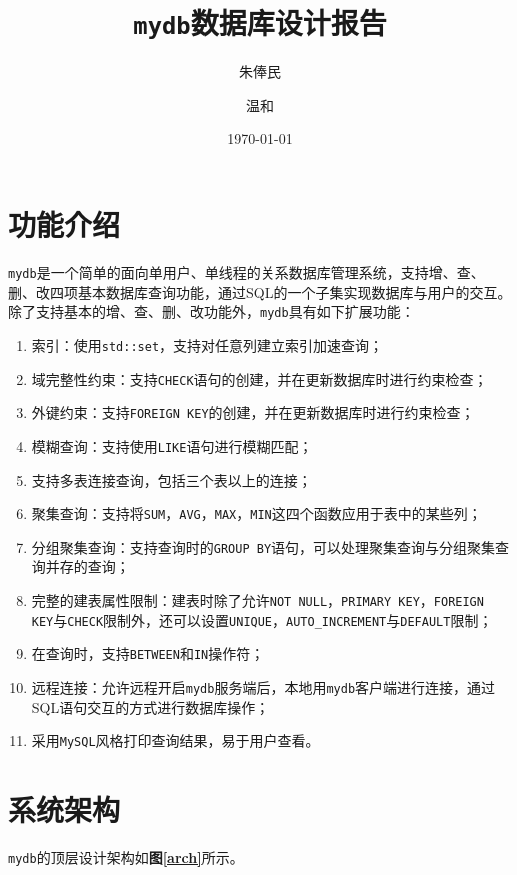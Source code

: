 \documentclass[11pt, a4paper]{article}
\title{\textbf{\texttt{mydb}数据库设计报告}}
\author{\kai 朱俸民\quad 2012011894 
\and \kai 温和\quad 2013011407}
\date{\kai \today}
\newcommand{\fref}[1]{\textbf{图\ref{#1}}}
\begin{document}
\maketitle

\section{功能介绍}

\texttt{mydb}是一个简单的面向单用户、单线程的关系数据库管理系统，支持增、查、删、改四项基本数据库查询功能，通过SQL的一个子集实现数据库与用户的交互。除了支持基本的增、查、删、改功能外，\texttt{mydb}具有如下扩展功能：

\begin{enumerate}
    \item 索引：使用\texttt{std::set}，支持对任意列建立索引加速查询；
    \item 域完整性约束：支持\texttt{CHECK}语句的创建，并在更新数据库时进行约束检查；
    \item 外键约束：支持\texttt{FOREIGN KEY}的创建，并在更新数据库时进行约束检查；
    \item 模糊查询：支持使用\texttt{LIKE}语句进行模糊匹配；
    \item 支持多表连接查询，包括三个表以上的连接；
    \item 聚集查询：支持将\texttt{SUM}，\texttt{AVG}，\texttt{MAX}，\texttt{MIN}这四个函数应用于表中的某些列；
    \item 分组聚集查询：支持查询时的\texttt{GROUP BY}语句，可以处理聚集查询与分组聚集查询并存的查询；
    \item 完整的建表属性限制：建表时除了允许\texttt{NOT NULL}，\texttt{PRIMARY KEY}，\texttt{FOREIGN KEY}与\texttt{CHECK}限制外，还可以设置\texttt{UNIQUE}，\texttt{AUTO\_INCREMENT}与\texttt{DEFAULT}限制；
    \item 在查询时，支持\texttt{BETWEEN}和\texttt{IN}操作符；
    \item 远程连接：允许远程开启\texttt{mydb}服务端后，本地用\texttt{mydb}客户端进行连接，通过SQL语句交互的方式进行数据库操作；
    \item 采用\texttt{MySQL}风格打印查询结果，易于用户查看。
\end{enumerate}

\section{系统架构}

\texttt{mydb}的顶层设计架构如\fref{arch}所示。
\end{document}

